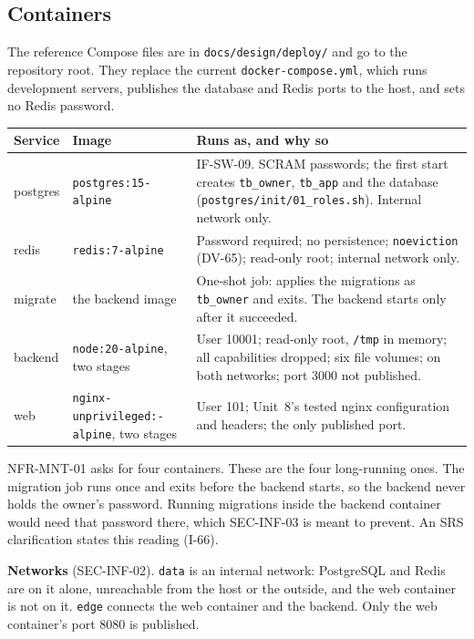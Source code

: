 \documentclass[11pt,a4paper]{article}
\newenvironment{dtable}[1]{\small\begin{longtable}{#1}}{\end{longtable}}
\begin{document}
\subsection{Containers}
The reference Compose files are in \texttt{docs/design/deploy/} and go to the repository root. They replace the current \texttt{docker-compose.\allowbreak yml}, which runs development servers, publishes the database and Redis ports to the host, and sets no Redis password.
\begin{dtable}{@{}>{\ttfamily\raggedright\arraybackslash}p{1.8cm}>{\raggedright\arraybackslash}p{3.7cm}>{\raggedright\arraybackslash}p{9.7cm}@{}}
\toprule
\textnormal{\textbf{Service}} & \textbf{Image} & \textbf{Runs as, and why so} \\ \midrule \endhead
postgres & \texttt{postgres:15-alpine} & IF-SW-09. SCRAM passwords; the first start creates \texttt{tb\_owner}, \texttt{tb\_app} and the database (\texttt{postgres/init/01\_\allowbreak roles.\allowbreak sh}). Internal network only. \\
redis & \texttt{redis:7-alpine} & Password required; no persistence; \texttt{noeviction} (DV-65); read-only root; internal network only. \\
migrate & the backend image & One-shot job: applies the migrations as \texttt{tb\_owner} and exits. The backend starts only after it succeeded. \\
backend & \texttt{node:20-alpine}, two stages & User 10001; read-only root, \texttt{/tmp} in memory; all capabilities dropped; six file volumes; on both networks; port 3000 not published. \\
web & \texttt{nginx-\allowbreak unprivileged:\allowbreak 1.29-alpine}, two stages & User 101; Unit~8's tested nginx configuration and headers; the only published port. \\
\bottomrule
\end{dtable}
NFR-MNT-01 asks for four containers. These are the four long-running ones. The migration job runs once and exits before the backend starts, so the backend never holds the owner's password. Running migrations inside the backend container would need that password there, which SEC-INF-03 is meant to prevent. An SRS clarification states this reading (I-66).

\textbf{Networks} (SEC-INF-02). \texttt{data} is an internal network: PostgreSQL and Redis are on it alone, unreachable from the host or the outside, and the web container is not on it. \texttt{edge} connects the web container and the backend. Only the web container's port 8080 is published.
\end{document}
